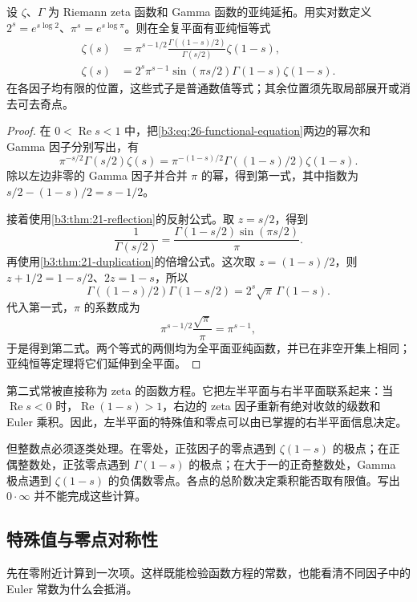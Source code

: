 \begin{proposition}[函数方程的等价形式]\label{b3:prop:26-functional-forms}
设 \(\zeta\)、\(\Gamma\) 为 Riemann zeta 函数和 Gamma 函数的亚纯延拓。用实对数定义 \(2^s=e^{s\log2}\)、\(\pi^s=e^{s\log\pi}\)。则在全复平面有亚纯恒等式
\begin{align}
 \zeta(s)
 &=\pi^{s-1/2}\frac{\Gamma((1-s)/2)}{\Gamma(s/2)}\zeta(1-s),
 \label{b3:eq:26-functional-gamma-ratio}\\
 \zeta(s)
 &=2^s\pi^{s-1}\sin(\pi s/2)\Gamma(1-s)\zeta(1-s).
 \label{b3:eq:26-functional-sine}
\end{align}
在各因子均有限的位置，这些式子是普通数值等式；其余位置须先取局部展开或消去可去奇点。
\end{proposition}
\begin{proof}
在 \(0<\operatorname{Re}s<1\) 中，把\eqref{b3:eq:26-functional-equation}两边的幂次和 Gamma 因子分别写出，有
\[
 \pi^{-s/2}\Gamma(s/2)\zeta(s)
 =\pi^{-(1-s)/2}\Gamma((1-s)/2)\zeta(1-s).
\]
除以左边非零的 Gamma 因子并合并 \(\pi\) 的幂，得到第一式，其中指数为 \(s/2-(1-s)/2=s-1/2\)。

接着使用\cref{b3:thm:21-reflection}的反射公式。取 \(z=s/2\)，得到
\[
 \frac1{\Gamma(s/2)}
 =\frac{\Gamma(1-s/2)\sin(\pi s/2)}\pi.
\]
再使用\cref{b3:thm:21-duplication}的倍增公式。这次取 \(z=(1-s)/2\)，则 \(z+1/2=1-s/2\)、\(2z=1-s\)，所以
\[
 \Gamma((1-s)/2)\Gamma(1-s/2)
 =2^s\sqrt\pi\,\Gamma(1-s).
\]
代入第一式，\(\pi\) 的系数成为
\[
 \pi^{s-1/2}\frac{\sqrt\pi}\pi=\pi^{s-1},
\]
于是得到第二式。两个等式的两侧均为全平面亚纯函数，并已在非空开集上相同；亚纯恒等定理将它们延伸到全平面。
\end{proof}

第二式常被直接称为 zeta 的函数方程。它把左半平面与右半平面联系起来：当 \(\operatorname{Re}s<0\) 时，\(\operatorname{Re}(1-s)>1\)，右边的 zeta 因子重新有绝对收敛的级数和 Euler 乘积。因此，左半平面的特殊值和零点可以由已掌握的右半平面信息决定。

但整数点必须逐类处理。在零处，正弦因子的零点遇到 \(\zeta(1-s)\) 的极点；在正偶整数处，正弦零点遇到 \(\Gamma(1-s)\) 的极点；在大于一的正奇整数处，Gamma 极点遇到 \(\zeta(1-s)\) 的负偶数零点。各点的总阶数决定乘积能否取有限值。写出 \(0\cdot\infty\) 并不能完成这些计算。

\subsection{特殊值与零点对称性}
\label{b3:subsec:260404}

先在零附近计算到一次项。这样既能检验函数方程的常数，也能看清不同因子中的 Euler 常数为什么会抵消。

